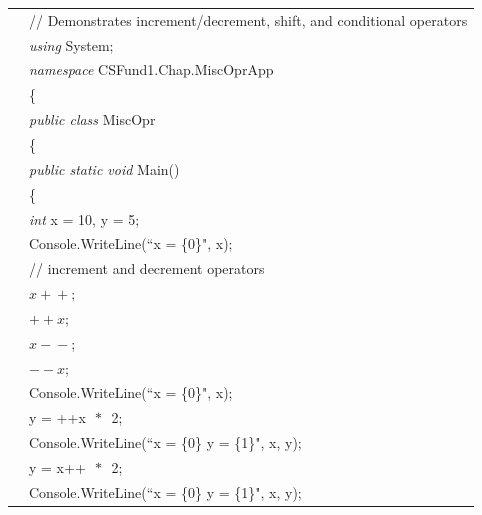 \renewcommand{\baselinestretch}{0.8}
\begin{program}
\begin{tabular}{>{\codelinenumfont}l>{\codelistingfont}l}

1 & // Demonstrates increment/decrement, shift, and conditional operators\\
2 & \emph{using} System;\\
3 & \emph{namespace} CSFund1.Chap\thechapter.MiscOprApp\\
4 & \{\\
5 &  \hspace{0.2in} \emph{public class} MiscOpr\\
6 &  \hspace{0.2in} \{\\
7 &  \hspace{0.4in} \emph{public static void} Main()\\
8 &  \hspace{0.4in} \{\\
9 &  \hspace{0.6in} \emph{int} x = 10, y = 5;\\
10 &  \hspace{0.6in} Console.WriteLine(``x = \{0\}", x);\\

11 &  \hspace{0.6in} // increment and decrement operators\\
12 &  \hspace{0.6in} $x+\!+$;\\
13 &  \hspace{0.6in} $+\!+x$;\\
14 &  \hspace{0.6in} $x-\!-$;\\
15 &  \hspace{0.6in} $-\!-x$;\\
16 &  \hspace{0.6in} Console.WriteLine(``x = \{0\}", x);\\

17 &  \hspace{0.6in} y = ++x $\,\ast\,$ 2;\\
18 &  \hspace{0.6in} Console.WriteLine(``x = \{0\}  y = \{1\}", x, y);\\

19 &  \hspace{0.6in} y = x++ $\,\ast\,$ 2;\\
20 &  \hspace{0.6in} Console.WriteLine(``x = \{0\}  y = \{1\}", x, y);\\


\end{tabular}
\end{program}
